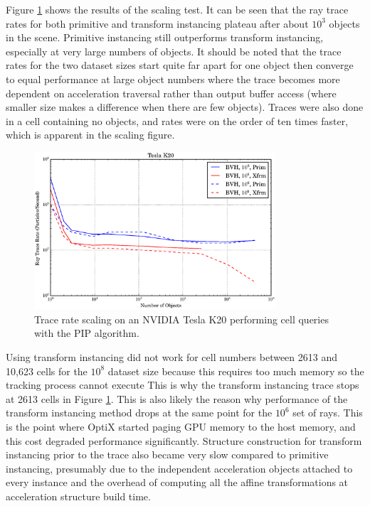 Figure \ref{prelim_optix_scaling} shows the results of the scaling test. It can be seen that the ray trace rates for both primitive and transform instancing plateau after about $10^3$ objects in the scene. %
 Primitive instancing still outperforms transform instancing, especially at very large numbers of objects.%
   It should be noted that the trace rates for the two dataset sizes start quite far apart for one object then converge to equal performance at large object numbers where the trace becomes more dependent on acceleration traversal rather than output buffer access (where smaller size makes a difference when there are few objects). %
  Traces were also done in a cell containing no objects, and rates were on the order of ten times faster, which is apparent in the scaling figure.%

\begin{figure}[h!] 
  \centering
    \includegraphics[width=0.8\textwidth]{graphics/prelim_optix_scaling.eps}
     \caption{Trace rate scaling on an NVIDIA Tesla K20 performing cell queries with the PIP algorithm. \label{prelim_optix_scaling} }
\end{figure}

Using transform instancing did not work for cell numbers between 2613 and 10,623 cells for the $10^8$ dataset size because this requires too much memory so the tracking process cannot execute %
This is why the transform instancing trace stops at 2613 cells in Figure \ref{prelim_optix_scaling}.  This is also likely the reason why performance of the transform instancing method drops at the same point for the $10^6$ set of rays.  This is the point where OptiX started paging GPU memory to the host memory, and this cost degraded performance significantly.  Structure construction for transform instancing prior to the trace also became very slow compared to primitive instancing, presumably due to the independent acceleration objects attached to every instance and the overhead of computing all the affine transformations at acceleration structure build time.

